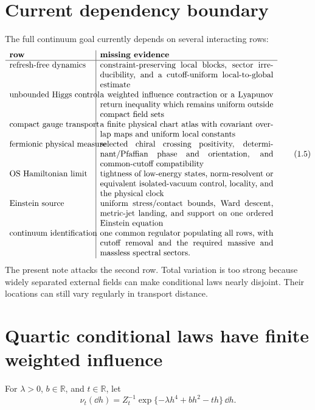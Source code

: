 \documentclass[11pt]{article}
\theoremstyle{remark}
\begin{document}
\section{Current dependency boundary}
\label{sec:v15v1-boundary}

The full continuum goal currently depends on several interacting
rows:
\[
\begin{array}{p{0.29\linewidth}|p{0.61\linewidth}}
\textbf{row}&\textbf{missing evidence}\\ \hline
\text{refresh-free dynamics}
 &constraint-preserving local blocks, sector irreducibility, and a
  cutoff-uniform local-to-global estimate\\
\text{unbounded Higgs control}
 &a weighted influence contraction or a Lyapunov return inequality
  which remains uniform outside compact field sets\\
\text{compact gauge transport}
 &a finite physical chart atlas with covariant overlap maps and
  uniform local constants\\
\text{fermionic physical measure}
 &selected chiral crossing positivity, determinant/Pfaffian phase
  and orientation, and common-cutoff compatibility\\
\text{OS Hamiltonian limit}
 &tightness of low-energy states, norm-resolvent or equivalent
  isolated-vacuum control, locality, and the physical clock\\
\text{Einstein source}
 &uniform stress/contact bounds, Ward descent, metric-jet landing,
  and support on one ordered Einstein equation\\
\text{continuum identification}
 &one common regulator populating all rows, with cutoff removal and
  the required massive and massless spectral sectors.
\end{array}                                                     \tag{1.5}
\]
The present note attacks the second row.  Total variation is too
strong because widely separated external fields can make
conditional laws nearly disjoint.  Their locations can still vary
regularly in transport distance.

\section{Quartic conditional laws have finite weighted influence}
\label{sec:v15v1-quartic}

For \(\lambda>0\), \(b\in\mathbb R\), and \(t\in\mathbb R\), let
\[
 \nu_t(\dd h)
 =Z_t^{-1}\exp\{-\lambda h^4+bh^2-th\}\,\dd h.                \tag{1.6}
\]
\end{document}
